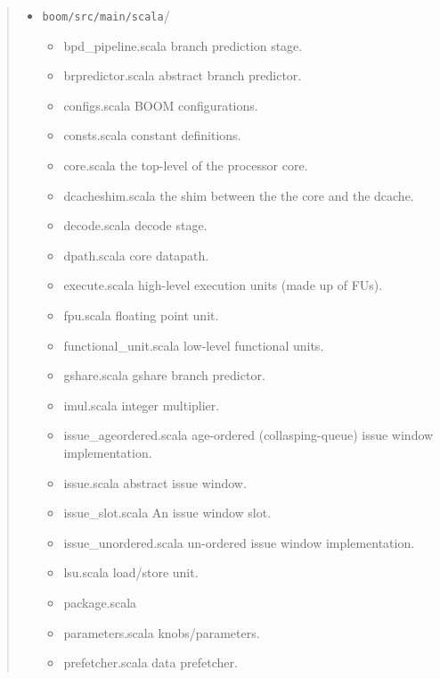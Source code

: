 \begin{quote}
\begin{itemize}
\item \verb=boom/src/main/scala=/\begin{itemize}
  \item bpd\_pipeline.scala {\footnotesize \color{red} branch prediction stage.}
  \item brpredictor.scala {\footnotesize \color{red} abstract branch predictor.}
  \item configs.scala {\footnotesize \color{red} BOOM configurations. }
  \item consts.scala {\footnotesize \color{red} constant definitions. }
  \item core.scala {\footnotesize \color{red} the top-level of the processor core.}
  \item dcacheshim.scala {\footnotesize \color{red} the shim between the the core and the dcache.}
  \item decode.scala {\footnotesize \color{red} decode stage.}
  \item dpath.scala {\footnotesize \color{red} core datapath.}
  \item execute.scala {\footnotesize \color{red} high-level execution units (made up of FUs).}
  \item fpu.scala {\footnotesize \color{red} floating point unit.}
  \item functional\_unit.scala {\footnotesize \color{red} low-level functional units.}
  \item gshare.scala {\footnotesize \color{red} gshare branch predictor.}
  \item imul.scala {\footnotesize \color{red} integer multiplier.}
  \item issue\_ageordered.scala {\footnotesize \color{red} age-ordered (collasping-queue) issue window implementation.}
  \item issue.scala {\footnotesize \color{red} abstract issue window.}
  \item issue\_slot.scala {\footnotesize \color{red} An issue window slot.}
  \item issue\_unordered.scala {\footnotesize \color{red} un-ordered issue window implementation.}
  \item lsu.scala {\footnotesize \color{red} load/store unit.}
  \item package.scala {\footnotesize \color{red} }
  \item parameters.scala {\footnotesize \color{red} knobs/parameters.}
  \item prefetcher.scala {\footnotesize \color{red} data prefetcher.}

\end{itemize}
\end{itemize}
\end{quote}
